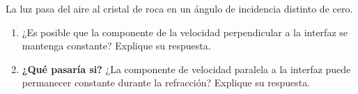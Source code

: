 \item La luz pasa del aire al cristal de roca en un ángulo de incidencia distinto de cero.
\begin{enumerate}
    \item ¿Es posible que la componente de la velocidad perpendicular a la interfaz se mantenga constante? Explique su respuesta.
    \item \textbf{¿Qué pasaría si?} ¿La componente de velocidad paralela a la interfaz puede permanecer constante durante la refracción? Explique su respuesta.
\end{enumerate}